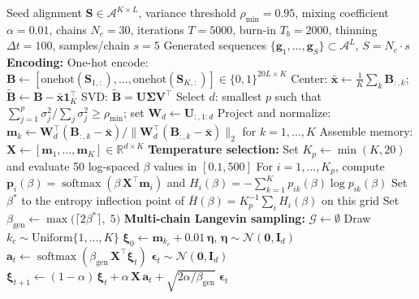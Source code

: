 \documentclass[11pt,onecolumn,twoside,lineno]{pnas-new}
\begin{document}
{\begin{algorithm}[h!]
\caption{Stochastic Attention Protein Sequence Generation}\label{alg:sa-pipeline}
\begin{algorithmic}[1]
\Require Seed alignment $\mathbf{S} \in \mathcal{A}^{K \times L}$, variance threshold $\rho_{\min} = 0.95$, mixing coefficient $\alpha = 0.01$, chains $N_c = 30$, iterations $T = 5000$, burn-in $T_b = 2000$, thinning $\Delta t = 100$, samples/chain $s = 5$
\Ensure Generated sequences $\{\mathbf{g}_1, \ldots, \mathbf{g}_S\} \subset \mathcal{A}^L$, \; $S = N_c \cdot s$
\State \textbf{Encoding:}
\State One-hot encode: $\mathbf{B} \leftarrow [\mathrm{onehot}(\mathbf{S}_{1,:}), \ldots, \mathrm{onehot}(\mathbf{S}_{K,:})] \in \{0,1\}^{20L \times K}$
\State Center: $\bar{\mathbf{x}} \leftarrow \frac{1}{K}\sum_k \mathbf{B}_{:,k}$; \; $\tilde{\mathbf{B}} \leftarrow \mathbf{B} - \bar{\mathbf{x}}\mathbf{1}_K^\top$
\State SVD: $\tilde{\mathbf{B}} = \mathbf{U}\boldsymbol{\Sigma}\mathbf{V}^\top$
\State Select $d$: smallest $p$ such that $\sum_{j=1}^{p}\sigma_j^2 / \sum_j \sigma_j^2 \geq \rho_{\min}$; set $\mathbf{W}_d \leftarrow \mathbf{U}_{:,1:d}$
\State Project and normalize: $\mathbf{m}_k \leftarrow \mathbf{W}_d^\top(\mathbf{B}_{:,k} - \bar{\mathbf{x}}) / \|\mathbf{W}_d^\top(\mathbf{B}_{:,k} - \bar{\mathbf{x}})\|_2$ \; for $k = 1,\ldots,K$
\State Assemble memory: $\mathbf{X} \leftarrow [\mathbf{m}_1, \ldots, \mathbf{m}_K] \in \mathbb{R}^{d \times K}$
\State \textbf{Temperature selection:}
\State Set $K_p \leftarrow \min(K,20)$ and evaluate 50 log-spaced $\beta$ values in $[0.1,500]$
\State For $i=1,\ldots,K_p$, compute $\mathbf{p}_i(\beta)=\operatorname{softmax}(\beta\,\mathbf{X}^\top\mathbf{m}_i)$ and $H_i(\beta)=-\sum_{k=1}^K p_{ik}(\beta)\log p_{ik}(\beta)$
\State Set $\beta^*$ to the entropy inflection point of $\bar H(\beta)=K_p^{-1}\sum_i H_i(\beta)$ on this grid
\State Set $\beta_{\mathrm{gen}} \leftarrow \max\!\bigl(\lceil 2\beta^* \rceil,\; 5\bigr)$
\State \textbf{Multi-chain Langevin sampling:}
\State $\mathcal{G} \leftarrow \emptyset$
    \State Draw $k_c \sim \mathrm{Uniform}\{1,\ldots,K\}$
    \State $\boldsymbol{\xi}_0 \leftarrow \mathbf{m}_{k_c} + 0.01\,\boldsymbol{\eta}$, \; $\boldsymbol{\eta} \sim \mathcal{N}(\mathbf{0}, \mathbf{I}_d)$
        \State $\mathbf{a}_t \leftarrow \operatorname{softmax}(\beta_{\mathrm{gen}}\,\mathbf{X}^\top\boldsymbol{\xi}_t)$
        \State $\boldsymbol{\epsilon}_t \sim \mathcal{N}(\mathbf{0}, \mathbf{I}_d)$
        \State $\boldsymbol{\xi}_{t+1} \leftarrow (1-\alpha)\,\boldsymbol{\xi}_t + \alpha\,\mathbf{X}\,\mathbf{a}_t + \sqrt{2\alpha/\beta_{\mathrm{gen}}}\;\boldsymbol{\epsilon}_t$

\end{algorithmic}
\end{algorithm}}
\end{document}
